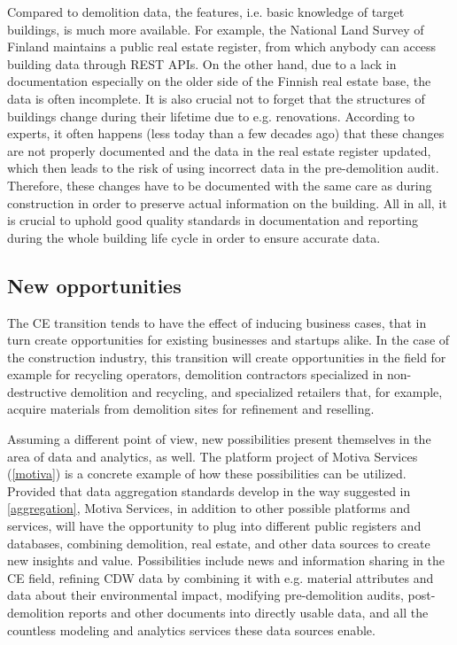 \documentclass[english, 12pt, a4paper, sci, utf8, a-2b, online]{aaltothesis}
\begin{document}
Compared to demolition data, the features, i.e. basic knowledge of target buildings, is much more available. For example, the National Land Survey of Finland maintains a public real estate register,
from which anybody can access building data through REST APIs. On the other hand, due to a lack in documentation especially on the older side of the Finnish real estate base, the data is often
incomplete. It is also crucial not to forget that the structures of buildings change during their lifetime due to e.g. renovations. According to experts, it often happens (less today than a
few decades ago) that these changes are not properly documented and the data in the real estate register updated, which then leads to the risk of using incorrect data in the pre-demolition audit.
Therefore, these changes have to be documented with the same care as during construction in order to preserve actual information on the building. All in all, it is crucial to uphold good quality standards
in documentation and reporting during the whole building life cycle in order to ensure accurate data.

\subsection{New opportunities}

The CE transition tends to have the effect of inducing business cases, that in turn create opportunities for existing businesses and startups alike. In the case of the construction industry,
this transition will create opportunities in the field for example for recycling operators, demolition contractors specialized in non-destructive demolition and recycling, and specialized retailers
that, for example, acquire materials from demolition sites for refinement and reselling.

Assuming a different point of view, new possibilities present themselves in the area of data and analytics, as well. The platform project of Motiva Services (\ref{motiva}) is a concrete example of how these
possibilities can be utilized. Provided that data aggregation standards develop in the way suggested in \ref{aggregation}, Motiva Services, in addition to other possible platforms and services, will have
the opportunity to plug into different public registers and databases, combining demolition, real estate, and other data sources to create new insights and value. Possibilities include news and
information sharing in the CE field, refining CDW data by combining it with e.g. material attributes and data about their environmental impact, modifying pre-demolition audits, post-demolition
reports and other documents into directly usable data, and all the countless modeling and analytics services these data sources enable.
\end{document}
